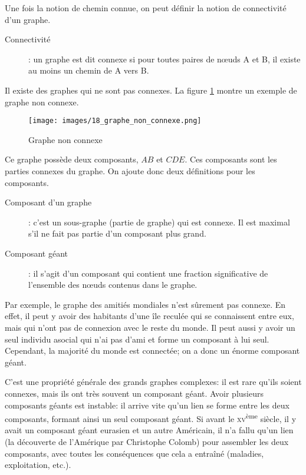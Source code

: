 Une fois la notion de chemin connue, on peut définir la notion de connectivité d'un graphe.
	\begin{description}
    	\item[Connectivité]: un graphe est dit connexe si pour toutes paires de n\oe uds A et B, il existe au moins un chemin de A vers B.\\
	\end{description}

Il existe des graphes qui ne sont pas connexes. La figure \ref{graphe_non_connexe} montre un exemple de graphe non connexe.

	\begin{figure}[!h]
	\center
	\texttt{[image: images/18\_graphe\_non\_connexe.png]}
	\caption{\label{graphe_non_connexe} Graphe non connexe}
	\end{figure}
	
Ce graphe possède deux composants, $AB$ et $CDE$. Ces composants sont les parties connexes du graphe. On ajoute donc deux définitions pour les composants.
	\begin{description}
    \item[Composant d'un graphe]: c'est un sous-graphe (partie de graphe) qui est connexe. Il est maximal s'il ne fait pas partie d'un composant plus grand.
    \item[Composant géant] : il s'agit d'un composant qui contient une fraction significative de l'ensemble des n\oe uds contenus dans le graphe.
    \end{description}
    
    Par exemple, le graphe des amitiés mondiales n'est sûrement pas connexe. En effet, il peut y avoir des habitants d'une île reculée qui se connaissent entre eux, mais qui n'ont pas de connexion avec le reste du monde. Il peut aussi y avoir un seul individu asocial qui n'ai pas d'ami et forme un composant à lui seul. Cependant, la majorité du monde est connectée; on a donc un énorme composant géant.
    
    \vspace{1ex}
    C'est une propriété générale des grands graphes complexes: il est rare qu'ils soient connexes, mais ils ont très souvent un composant géant. Avoir plusieurs composants géants est instable: il arrive vite qu'un lien se forme entre les deux composants, formant ainsi un seul composant géant. Si avant le \textsc{xv}\textsuperscript{ème} siècle, il y avait un composant géant eurasien et un autre Américain, il n'a fallu qu'un lien (la découverte de l'Amérique par Christophe Colomb) pour assembler les deux composants, avec toutes les conséquences que cela a entraîné (maladies, exploitation, etc.).
    		
